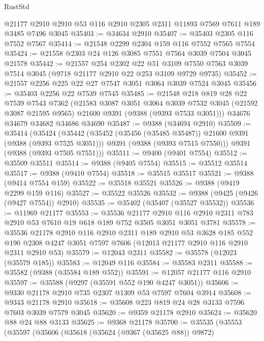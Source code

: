 \begin{lexlean}{RustStd}
\begin{coremodule}
    @21177
    @2910
    @2910
    @53
    @116
    @2910
    @2305
    @2311
    @11893
    @7569
    @7611
    @189
    @3485
    @7496
    @3045
@35403 := @34634 @2910
@35407 := @35403 @2305 @116 @7552 @7567
@35414 := @21548 @2299 @2304 @159 @116 @7552 @7565 @7554
@35424 := @21558 @2303 @24 @126 @3085 @7551 @7564 @3039 @7504 @3045 @21578
@35442 := @21557
    @254
    @2302
    @22
    @51
    @3109
    @7550
    @7563
    @3039
    @7514
    @3045
    (@9718 @21177 @2910 @22 @253 @3109 @9729 @9735)
@35452 := @21557 @2256 @225 @22 @27 @7547 @3051 @3064 @3039 @7524 @3045
@35456 := @35403 @2256 @22 @7539 @7545
@35485 := @21548
    @218
    @819
    @28
    @22
    @7539
    @7543
    @7362
    (@21583
      @3087
      @3051
      @3064
      @3039
      @7532
      @3045
      (@21592 @3087 @21595 @9565)
      @21600
      @9391
      (@9388 (@9393 @7533 @3051)))
    @34676
    @34679
    @34682
    @34686
    @34690
@35487 := @9388 (@34694 @2910)
@35509 := @35414
    (@35424
      (@35442
        (@35452 (@35456 (@35485 @35487)) @21600 @9391 (@9388 (@9393 @7525 @3051)))
        @9391
        (@9388 (@9393 @7515 @7550)))
      @9391
      (@9388 (@9393 @7505 @7551)))
@35511 := @9400 (@9401 @7554)
@35512 := @35509 @35511
@35514 := @9388 (@9405 @7554)
@35515 := @35512 @35514
@35517 := @9388 (@9410 @7554)
@35518 := @35515 @35517
@35521 := @9388 (@9414 @7554 @159)
@35522 := @35518 @35521
@35526 := @9388 (@9419 @2299 @159 @116)
@35527 := @35522 @35526
@35532 := @9388 (@9425 (@9426 (@9427 @7554)) @2910)
@35535 := @35402 (@35407 (@35527 @35532))
@35536 := @11969 @21177
@35553 := @35536
    @21177
    @2910
    @116
    @2910
    @2311
    @783
    @2910
    @53
    @7610
    @19
    @618
    @189
    @752
    @3505
    @3051
    @3051
    @3781
@35578 := @35536
    @21178
    @2910
    @116
    @2910
    @2311
    @189
    @2910
    @53
    @3628
    @185
    @552
    @190
    @2308
    @4247
    @3051
    @7597
    @7606
    (@12013 @21177 @2910 @116 @2910 @2311 @2910 @53)
@35579 := @12043 @2311
@35582 := @35578 (@12023 (@35579 @185))
@35583 := @12049 @116
@35584 := @35583 @2311
@35588 := @35582 (@9388 (@35584 @189 @552))
@35591 := @12057 @21177 @116 @2910
@35597 := @35588 (@9297 (@35591 @552 @190 @4247 @3051))
@35606 := @9330 @21178 @2910 @735 @2307 @1309 @53 @7597 @7604 @3914
@35608 := @9343 @21178 @2910
@35618 := @35608 @223 @819 @24 @28 @3133 @7596 @7603 @3039 @7579 @3045
@35620 := @9359 @21178 @2910
@35624 := @35620 @88 @24 @88 @3133
@35625 := @9368 @21178
@35700 := @35535
    (@35553
      (@35597
        (@35606
          (@35618
            (@35624 (@9367 (@35625 @88)) @9872)

\end{coremodule}
\end{lexlean}
